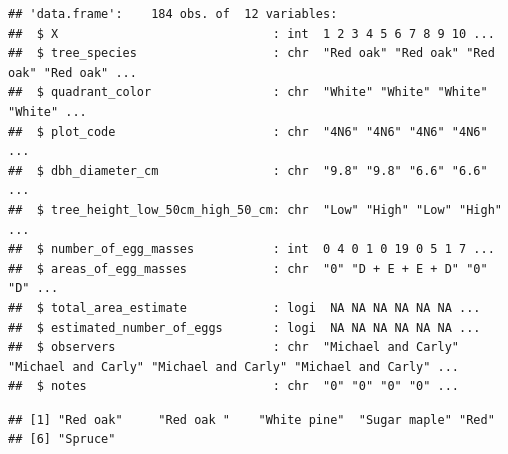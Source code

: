 \documentclass[
]{article}
\newenvironment{Shaded}{\begin{snugshade}}{\end{snugshade}}
\newcommand{\CommentTok}[1]{\textcolor[rgb]{0.56,0.35,0.01}{\textit{#1}}}
\newcommand{\FunctionTok}[1]{\textcolor[rgb]{0.13,0.29,0.53}{\textbf{#1}}}
\newcommand{\NormalTok}[1]{#1}
\newcommand{\OtherTok}[1]{\textcolor[rgb]{0.56,0.35,0.01}{#1}}
\newcommand{\SpecialCharTok}[1]{\textcolor[rgb]{0.81,0.36,0.00}{\textbf{#1}}}
\newcommand{\StringTok}[1]{\textcolor[rgb]{0.31,0.60,0.02}{#1}}
\begin{document}
\begin{verbatim}
## 'data.frame':    184 obs. of  12 variables:
##  $ X                              : int  1 2 3 4 5 6 7 8 9 10 ...
##  $ tree_species                   : chr  "Red oak" "Red oak" "Red oak" "Red oak" ...
##  $ quadrant_color                 : chr  "White" "White" "White" "White" ...
##  $ plot_code                      : chr  "4N6" "4N6" "4N6" "4N6" ...
##  $ dbh_diameter_cm                : chr  "9.8" "9.8" "6.6" "6.6" ...
##  $ tree_height_low_50cm_high_50_cm: chr  "Low" "High" "Low" "High" ...
##  $ number_of_egg_masses           : int  0 4 0 1 0 19 0 5 1 7 ...
##  $ areas_of_egg_masses            : chr  "0" "D + E + E + D" "0" "D" ...
##  $ total_area_estimate            : logi  NA NA NA NA NA NA ...
##  $ estimated_number_of_eggs       : logi  NA NA NA NA NA NA ...
##  $ observers                      : chr  "Michael and Carly" "Michael and Carly" "Michael and Carly" "Michael and Carly" ...
##  $ notes                          : chr  "0" "0" "0" "0" ...
\end{verbatim}

\begin{Shaded}
\end{Shaded}

\begin{verbatim}
## [1] "Red oak"     "Red oak "    "White pine"  "Sugar maple" "Red"        
## [6] "Spruce"
\end{verbatim}

\begin{Shaded}
\end{Shaded}
\end{document}
